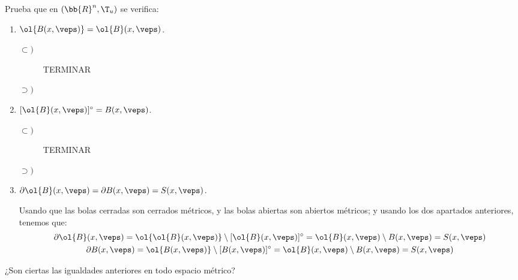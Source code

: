 \begin{ejercicio}
    Prueba que en $(\bb{R}^n, \T_u)$ se verifica:
    \begin{enumerate}[label=\alph*)]
        \item $\ol{B(x,\veps)} = \ol{B}(x,\veps)$.

        \begin{description}
            \item[$\subset)$] 
            TERMINAR
            \item[$\supset)$]
        \end{description}
        
        \item $[\ol{B}(x,\veps)]^\circ = B(x,\veps)$.

        \begin{description}
            \item[$\subset)$] 
            TERMINAR
            \item[$\supset)$]
        \end{description}
        
        \item $\partial \ol{B}(x,\veps) = \partial B(x,\veps) = S(x,\veps)$.

        Usando que las bolas cerradas son cerrados métricos, y las bolas abiertas son abiertos métricos; y usando los dos apartados anteriores, tenemos que:
        \begin{gather*}
            \partial \ol{B}(x,\veps) = \ol{\ol{B}(x,\veps)} \setminus [\ol{B}(x,\veps)]^\circ = \ol{B}(x,\veps)\setminus B(x,\veps)=S(x,\veps) \\
            \partial {B}(x,\veps) = \ol{{B}(x,\veps)} \setminus [{B}(x,\veps)]^\circ = \ol{B}(x,\veps)\setminus B(x,\veps)=S(x,\veps)
        \end{gather*}
        
    \end{enumerate}
    ¿Son ciertas las igualdades anteriores en todo espacio métrico?
\end{ejercicio}

